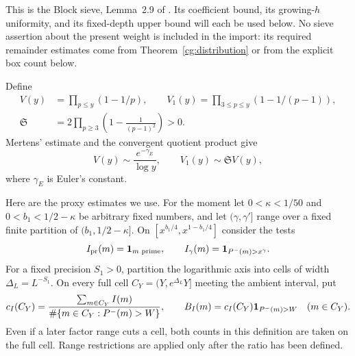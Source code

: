 This is the Block sieve, Lemma~2.9 of \cite{SmoothShifted}. Its
coefficient bound, its growing-$h$ uniformity, and its fixed-depth
upper bound will each be used below. No sieve assertion about the
present weight is included in the import: its required remainder
estimates come from Theorem~\ref{cg:distribution} or from the explicit
box count below.

Define
\begin{equation}\label{ex:euler-products}
 \begin{split}
 V(y)&=\prod_{p\le y}(1-1/p),\qquad
 V_1(y)=\prod_{3\le p\le y}(1-1/(p-1)),\\
 \mathfrak S&=2\prod_{p\ge3}\left(1-\frac1{(p-1)^2}\right)>0.
 \end{split}
\end{equation}
Mertens' estimate and the convergent quotient product give
\begin{equation}\label{ex:mertens}
 V(y)\sim\frac{e^{-\gamma_E}}{\log y},\qquad
 V_1(y)\sim\mathfrak S V(y),
\end{equation}
where $\gamma_E$ is Euler's constant.

Here are the proxy estimates we use. For the moment let
$0<\kappa<1/50$ and $0<b_1<1/2-\kappa$ be arbitrary fixed numbers,
and let $(\gamma,\gamma']$ range over a fixed finite partition of
$(b_1,1/2-\kappa]$. On
$[x^{b_1/4},x^{1-b_1/4}]$ consider the tests
\[
 I_{\mathrm{pr}}(m)=\mathbf{1}_{m\text{ prime}},\qquad
 I_\gamma(m)=\mathbf{1}_{P^-(m)>x^\gamma}.
\]
For a fixed precision $S_1>0$, partition the logarithmic axis into
cells of width $\Delta_L=L^{-S_1}$. On every full cell
$C_Y=(Y,e^{\Delta_L}Y]$ meeting the ambient interval, put
\begin{equation}\label{ex:proxy-definition}
 c_I(C_Y)=
 \frac{\sum_{m\in C_Y}I(m)}
      {\#\{m\in C_Y:P^-(m)>W\}},\qquad
 B_I(m)=c_I(C_Y)\mathbf{1}_{P^-(m)>W}\quad(m\in C_Y).
\end{equation}
Even if a later factor range cuts a cell, both counts in this
definition are taken on the full cell. Range restrictions are
applied only after the ratio has been defined.

